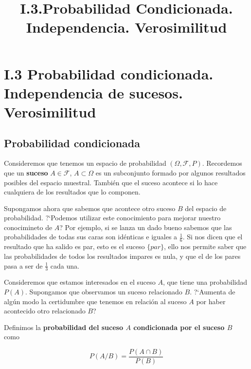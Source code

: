 \documentclass[11pt]{article}
\title{I.3.Probabilidad Condicionada. Independencia. Verosimilitud}
\begin{document}
    
    
    \maketitle
    
    

    
    \section*{I.3 Probabilidad condicionada. Independencia de sucesos.
Verosimilitud}\label{i.3-probabilidad-condicionada.-independencia-de-sucesos.-verosimilitud}

\subsection*{Probabilidad condicionada}\label{probabilidad-condicionada}

Consideremos que tenemos un espacio de probabilidad
\((\Omega, \mathscr{F}, P)\). Recordemos que un \textbf{suceso}
\(A \in \mathscr{F}\), \(A \subset \Omega\) es un subconjunto formado
por algunos resultados posibles del espacio muestral. También que el
suceso acontece si lo hace cualquiera de los resultados que lo componen.

Supongamos ahora que sabemos que acontece otro suceso \(B\) del espacio
de probabilidad. ?`Podemos utilizar este conocimiento para mejorar
nuestro conocimineto de \(A\)? Por ejemplo, si se lanza un dado bueno
sabemos que las probabilidades de todas sus caras son idénticas e
iguales a \(\frac{1}{6}\). Si nos dicen que el resultado que ha salido
es par, esto es el suceso \(\{par\}\), ello nos permite saber que las
probabilidades de todos los resultados impares es nula, y que el de los
pares pasa a ser de \(\frac{1}{3}\) cada una.


    Consideremos que estamos interesados en el suceso \(A\), que tiene una
probabilidad \(P(A)\). Supongamos que observamos un suceso relacionado
\(B\). ?`Aumenta de algún modo la certidumbre que tenemos en relación al
suceso \(A\) por haber acontecido otro relacionado \(B\)?

Definimos la \textbf{probabilidad del suceso \(A\) condicionada por el
suceso \(B\)} como

\[P(A/B) = \frac{P(A\cap B)}{P(B)}\]

\end{document}
